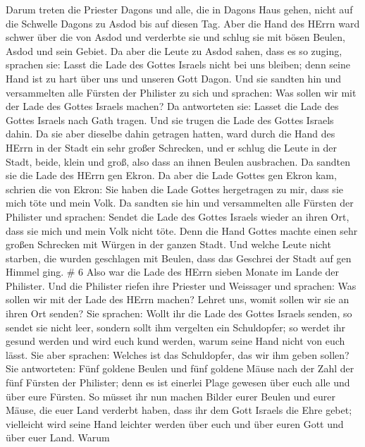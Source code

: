 Darum treten die Priester Dagons und alle, die in Dagons Haus gehen,
nicht auf die Schwelle Dagons zu Asdod bis auf diesen Tag. 
Aber die Hand des HErrn ward schwer über die von Asdod und verderbte sie
und schlug sie mit bösen Beulen, Asdod und sein Gebiet.  Da
aber die Leute zu Asdod sahen, dass es so zuging, sprachen sie: Lasst
die Lade des Gottes Israels nicht bei uns bleiben; denn seine Hand ist
zu hart über uns und unseren Gott Dagon.  Und sie sandten
hin und versammelten alle Fürsten der Philister zu sich und sprachen:
Was sollen wir mit der Lade des Gottes Israels machen? Da antworteten
sie: Lasset die Lade des Gottes Israels nach Gath tragen. Und sie trugen
die Lade des Gottes Israels dahin.  Da sie aber dieselbe
dahin getragen hatten, ward durch die Hand des HErrn in der Stadt ein
sehr großer Schrecken, und er schlug die Leute in der Stadt, beide,
klein und groß, also dass an ihnen Beulen ausbrachen.  Da
sandten sie die Lade des HErrn gen Ekron. Da aber die Lade Gottes gen
Ekron kam, schrien die von Ekron: Sie haben die Lade Gottes hergetragen
zu mir, dass sie mich töte und mein Volk.  Da sandten sie
hin und versammelten alle Fürsten der Philister und sprachen: Sendet die
Lade des Gottes Israels wieder an ihren Ort, dass sie mich und mein Volk
nicht töte. Denn die Hand Gottes machte einen sehr großen Schrecken mit
Würgen in der ganzen Stadt.  Und welche Leute nicht
starben, die wurden geschlagen mit Beulen, dass das Geschrei der Stadt
auf gen Himmel ging. \# 6  Also war die Lade des HErrn
sieben Monate im Lande der Philister.  Und die Philister
riefen ihre Priester und Weissager und sprachen: Was sollen wir mit der
Lade des HErrn machen? Lehret uns, womit sollen wir sie an ihren Ort
senden?  Sie sprachen: Wollt ihr die Lade des Gottes Israels
senden, so sendet sie nicht leer, sondern sollt ihm vergelten ein
Schuldopfer; so werdet ihr gesund werden und wird euch kund werden,
warum seine Hand nicht von euch lässt.  Sie aber sprachen:
Welches ist das Schuldopfer, das wir ihm geben sollen? Sie antworteten:
Fünf goldene Beulen und fünf goldene Mäuse nach der Zahl der fünf
Fürsten der Philister; denn es ist einerlei Plage gewesen über euch alle
und über eure Fürsten.  So müsset ihr nun machen Bilder
eurer Beulen und eurer Mäuse, die euer Land verderbt haben, dass ihr dem
Gott Israels die Ehre gebet; vielleicht wird seine Hand leichter werden
über euch und über euren Gott und über euer Land.  Warum
